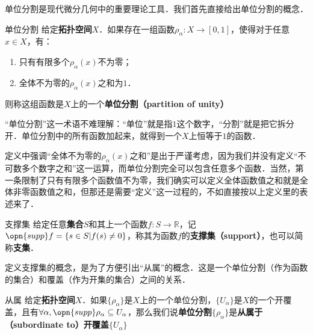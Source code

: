 

单位分割是现代微分几何中的重要理论工具．我们首先直接给出单位分割的概念．

\begin{definition}{单位分割}
给定\textbf{拓扑空间}$X$．如果存在一组函数$\rho_\alpha: X \to [0, 1]$，使得对于任意$x\in X$，有：
\begin{enumerate}
\item 只有有限多个$\rho_\alpha(x)$不为零；
\item 全体不为零的$\rho_\alpha(x)$之和为$1$．
\end{enumerate}
则称这组函数是$X$上的一个\textbf{单位分割（partition of unity）}
\end{definition}

“单位分割”这一术语不难理解：“单位”就是指$1$这个数字，“分割”就是把它拆分开．单位分割中的所有函数加起来，就得到一个$X$上恒等于$1$的函数．

定义中强调“全体不为零的$\rho_\alpha(x)$之和”是出于严谨考虑，因为我们并没有定义“不可数多个数字之和”这一运算，而单位分割完全可以包含任意多个函数．当然，第一条限制了只有有限多个函数值不为零，我们确实可以定义全体函数值之和就是全体非零函数值之和，但那还是需要“定义”这一过程的，不如直接按以上定义里的表述来了．

\begin{definition}{支撑集}
给定任意\textbf{集合}$S$和其上一个函数$f:S\to\mathbb{R}$，记$\opn{supp} f = \{s\in S| f(s)\not=0\}$，称其为函数$f$的\textbf{支撑集（support）}，也可以简称\textbf{支集}．
\end{definition}

定义支撑集的概念，是为了方便引出“从属”的概念．这是一个单位分割（作为函数的集合）和覆盖（作为开集的集合）之间的关系．

\begin{definition}{从属}
给定\textbf{拓扑空间}$X$．如果$\{\rho_\alpha\}$是$X$上的一个单位分割，$\{U_\alpha\}$是$X$的一个开覆盖，且有$\forall \alpha, \opn{supp}\rho_\alpha\subseteq U_\alpha$，那么我们说\textbf{单位分割}$\{\rho_\alpha\}$是\textbf{从属于（subordinate to）}\textbf{开覆盖}$\{U_\alpha\}$
\end{definition}





